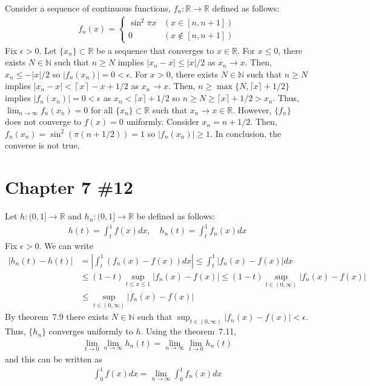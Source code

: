 \documentclass{scrartcl}
\begin{document}
Consider a sequence of continuous functions, \(f_n: \mathbb{R} \to \mathbb{R}\)
defined as follows:
\begin{align*}
  f_n(x) = \begin{cases}
    \sin^2 \pi x & (x \in [n, n + 1]) \\
    0 & (x \not \in [n, n + 1])
  \end{cases}
\end{align*}
Fix \(\epsilon > 0\). Let \(\{x_n\} \subset \mathbb{R}\) be a sequence that
converges to \(x \in \mathbb{R}\). For \(x \leq 0\), there exists \(N \in
\mathbb{N}\) such that \(n \geq N\) implies \(|x_n - x| \leq |x| / 2\) as
\(x_n \to x\). Then, \(x_n \leq -|x| / 2\) so \(|f_n(x_n)| = 0 < \epsilon\).
For \(x > 0\), there exists \(N \in \mathbb{N}\) such that \(n \geq N\)
implies \(|x_n - x| < \left\lceil x \right\rceil - x + 1 / 2\) as \(x_n \to
x\). Then, \(n \geq \max\{N, \lceil x \rceil + 1 / 2\}\) implies \(|f_n(x_n)| =
0 < \epsilon\) as \(x_n < \lceil x \rceil + 1 / 2\) so \(n \geq N \geq \lceil
x \rceil + 1 / 2 > x_n\). Thus, \(\lim_{n \to \infty} f_n(x_n) = 0\) for all
\(\{x_n\} \subset \mathbb{R}\) such that \(x_n \to x \in \mathbb{R}\). However,
\(\{f_n\}\) does not converge to \(f(x) = 0\) uniformly. Consider \(x_n = n + 1
/ 2\). Then, \(f_n(x_n) = \sin^2 (\pi(n + 1 / 2)) = 1\) so \(|f_n(x_n)| \geq
1\). In conclusion, the converse is not true.

\section{Chapter 7 \#12}
Let \(h: (0, 1] \to \mathbb{R}\) and \(h_n: (0, 1] \to \mathbb{R}\) be defined
as follows:
\begin{align*}
  h(t) = \int^1_t f(x) dx, \quad h_n(t) = \int^1_t f_n(x) dx
\end{align*}
Fix \(\epsilon > 0\). We can write
\begin{align*}
  |h_n(t) - h(t)|
  &= \left| \int^1_t (f_n(x) - f(x)) dx \right|
  \leq \int^1_t |f_n(x) - f(x)| dx \\
  &\leq (1 - t) \sup_{t \leq x \leq 1} |f_n(x) - f(x)|
  \leq (1 - t) \sup_{t \in (0, \infty)} |f_n(x) - f(x)| \\
  &\leq \sup_{t \in (0, \infty)} |f_n(x) - f(x)|
\end{align*}
By theorem~7.9 there exists \(N \in \mathbb{N}\) such that \(\sup_{t \in (0,
\infty)} |f_n(x) - f(x)| < \epsilon\). Thus, \(\{h_n\}\) converges uniformly to
\(h\). Using the theorem~7.11,
\begin{align*}
  \lim_{t \to 0} \lim_{n \to \infty} h_n(t)
  = \lim_{n \to \infty} \lim_{t \to 0} h_n(t)
\end{align*}
and this can be written as
\begin{align}\label{sec6_zero_to_one}
  \int^1_0 f(x) dx = \lim_{n \to \infty} \int^1_0 f_n(x) dx
\end{align}
\end{document}
